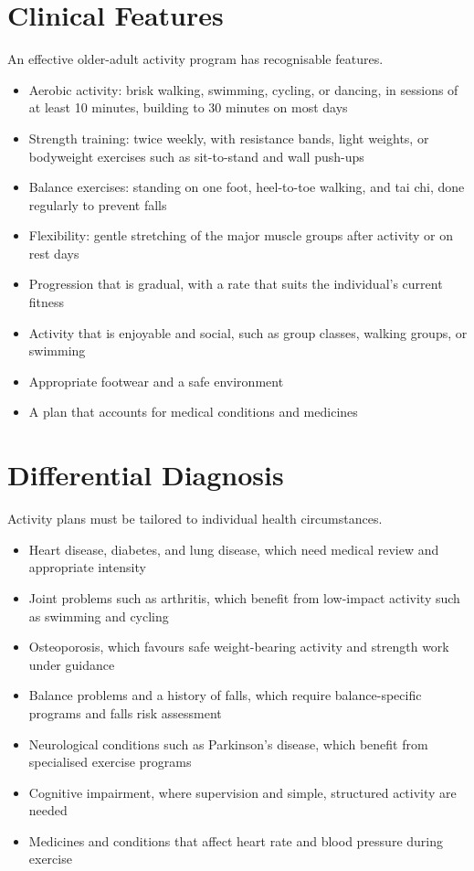 \section*{Clinical Features}
An effective older-adult activity program has recognisable features.
\begin{itemize}
    \item Aerobic activity: brisk walking, swimming, cycling, or dancing, in sessions of at least 10 minutes, building to 30 minutes on most days
    \item Strength training: twice weekly, with resistance bands, light weights, or bodyweight exercises such as sit-to-stand and wall push-ups
    \item Balance exercises: standing on one foot, heel-to-toe walking, and tai chi, done regularly to prevent falls
    \item Flexibility: gentle stretching of the major muscle groups after activity or on rest days
    \item Progression that is gradual, with a rate that suits the individual's current fitness
    \item Activity that is enjoyable and social, such as group classes, walking groups, or swimming
    \item Appropriate footwear and a safe environment
    \item A plan that accounts for medical conditions and medicines
\end{itemize}

\section*{Differential Diagnosis}
Activity plans must be tailored to individual health circumstances.
\begin{itemize}
    \item Heart disease, diabetes, and lung disease, which need medical review and appropriate intensity
    \item Joint problems such as arthritis, which benefit from low-impact activity such as swimming and cycling
    \item Osteoporosis, which favours safe weight-bearing activity and strength work under guidance
    \item Balance problems and a history of falls, which require balance-specific programs and falls risk assessment
    \item Neurological conditions such as Parkinson's disease, which benefit from specialised exercise programs
    \item Cognitive impairment, where supervision and simple, structured activity are needed
    \item Medicines and conditions that affect heart rate and blood pressure during exercise
\end{itemize}

